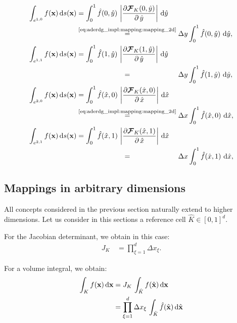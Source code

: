 \documentclass{scrreprt}
\theoremstyle{definition}
\theoremstyle{nonumberplain}
\renewcommand{\vec}[1]{{\textbf{#1}}}
\newcommand{\cell}{K}
\newcommand{\face}{e}
\newcommand{\dV}{\text{d}\vec{x}}
\newcommand{\ds}{\text{d}s}
\newcommand{\refVec}[1]{\hat{\vec{#1}}}
\newcommand{\refCell}{\hat{\cell}}
\newcommand{\mapping}{\boldsymbol{\mathcal{F}}_{\cell}}
\newcommand{\detJ}{J_\cell}
\newcommand{\refdV}{\textup{d}\hat{\vec{x}}}
\newcommand{\refdx}{\textup{d}\hat{x}}
\newcommand{\refdy}{\textup{d}\hat{y}}
\begin{document}
\begin{align}
\int_{\face^{1,0}} f(\vec{x})\,\ds(\vec{x}) &=
\int_{0}^1\hat{f}(0,\hat{y})\,\left|\frac{\partial
\mapping(0,\hat{y})}{\partial\,\hat{y}}\right|\,\refdy
\notag\\
&\overset{\textup{\eqref{eq:aderdg_impl:mapping:mapping_2d}}}{=}
\Delta y
\int_{0}^1\hat{f}(0,\hat{y})\,\,\refdy,
\\
\int_{\face^{1,1}} f(\vec{x})\,\ds(\vec{x}) &=
\int_{0}^1\hat{f}(1,\hat{y})\,\left|\frac{\partial
\mapping(1,\hat{y})}{\partial\,\hat{y}}\right|\,\refdy
\notag\\
&\overset{\phantom{\textup{\eqref{eq:aderdg_impl:mapping:mapping_2d}}}}{=}
\Delta y
\int_{0}^1\hat{f}(1,\hat{y})\,\,\refdy,
\\
\int_{\face^{2,0}} f(\vec{x})\,\ds(\vec{x}) &=
\int_{0}^1\hat{f}(\hat{x},0)\,\left|\frac{\partial
\mapping(\hat{x},0)}{\partial\,\hat{x}}\right|\,\refdx
\notag\\
&\overset{\textup{\eqref{eq:aderdg_impl:mapping:mapping_2d}}}{=}
\Delta x
\int_{0}^1\hat{f}(\hat{x},0)\,\,\refdx,
\\
\int_{\face^{2,1}} f(\vec{x})\,\ds(\vec{x}) &=
\int_{0}^1\hat{f}(\hat{x},1)\,\left|\frac{\partial
\mapping(\hat{x},1)}{\partial\,\hat{x}}\right|\,\refdx
\notag
\\
&\overset{\phantom{\textup{\eqref{eq:aderdg_impl:mapping:mapping_2d}}}}{=}
\Delta x
\int_{0}^1\hat{f}(\hat{x},1)\,\,\refdx,
\end{align}

\subsection{Mappings in arbitrary dimensions}

All concepts considered in the previous section naturally extend to
higher dimensions.
Let us consider in this sections a reference cell $\refCell\in[0,1]^d$.

For the Jacobian determinant, we obtain in this case:
\begin{align}
\detJ\,
&=
\prod_{\xi=1}^{d}
\Delta x_\xi.
\end{align}

For a volume integral, we obtain:
\begin{align}
\label{eq:ader_impl:mappings:volume_integral}
\int_\cell f(\vec{x})\,\dV 
&=
\detJ\,
\int_{\refCell} f(\refVec{x})\,\dV
\notag
\\
&=
\prod_{\xi=1}^{d}
\Delta x_\xi
\,
\int_{\refCell} \hat{f}(\refVec{x})\,\refdV
\end{align} 
\end{document}
